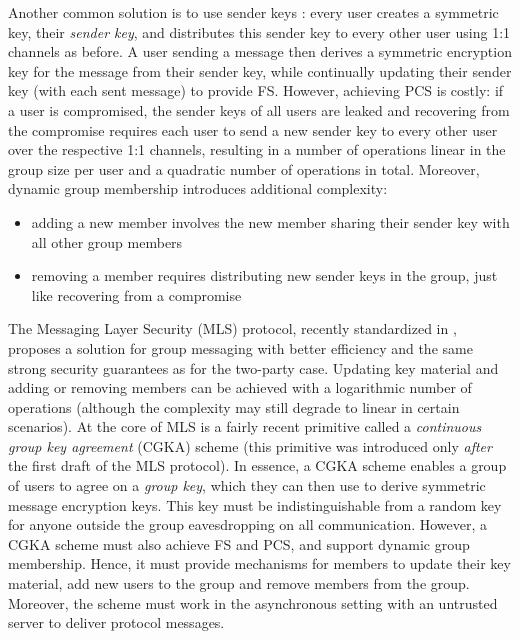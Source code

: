 Another common solution is to use sender keys \cite{sender-keys}: every user creates a symmetric key, their \emph{sender key}, and distributes this sender key to every other user using 1:1 channels as before. A user sending a message then derives a symmetric encryption key for the message from their sender key, while continually updating their sender key (with each sent message) to provide FS. However, achieving PCS is costly: if a user is compromised, the sender keys of all users are leaked and recovering from the compromise requires each user to send a new sender key to every other user over the respective 1:1 channels, resulting in a number of operations linear in the group size per user and a quadratic number of operations in total. Moreover, dynamic group membership introduces additional complexity:
\begin{itemize}
	\item adding a new member involves the new member sharing their sender key with all other group members 
	\item removing a member requires distributing new sender keys in the group, just like recovering from a compromise
\end{itemize}
The Messaging Layer Security (MLS) protocol, recently standardized in \cite{rfc9420}, proposes a solution for group messaging with better efficiency and the same strong security guarantees as for the two-party case. Updating key material and adding or removing members can be achieved with a logarithmic number of operations (although the complexity may still degrade to linear in certain scenarios). At the core of MLS is a fairly recent primitive called a \emph{continuous group key agreement} (CGKA) scheme \cite{rtreekem} (this primitive was introduced only \emph{after} the first draft of the MLS protocol). In essence, a CGKA scheme enables a group of users to agree on a \emph{group key}, which they can then use to derive symmetric message encryption keys. This key must be indistinguishable from a random key for anyone outside the group eavesdropping on all communication. However, a CGKA scheme must also achieve FS and PCS, and support dynamic group membership. Hence, it must provide mechanisms for members to update their key material, add new users to the group and remove members from the group. Moreover, the scheme must work in the asynchronous setting with an untrusted server to deliver protocol messages.

